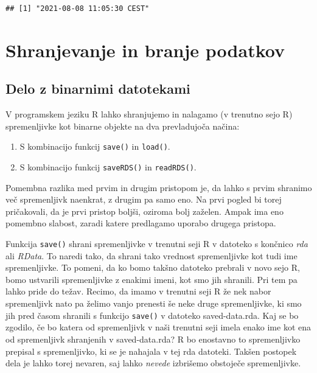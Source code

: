 \documentclass[
]{book}
\providecommand{\tightlist}{%
  \setlength{\itemsep}{0pt}\setlength{\parskip}{0pt}}
\begin{document}
\begin{verbatim}
## [1] "2021-08-08 11:05:30 CEST"
\end{verbatim}

\hypertarget{shranjevanje-in-branje-podatkov}{%
\section{Shranjevanje in branje podatkov}\label{shranjevanje-in-branje-podatkov}}

\hypertarget{delo-z-binarnimi-datotekami}{%
\subsection{Delo z binarnimi datotekami}\label{delo-z-binarnimi-datotekami}}

V programskem jeziku R lahko shranjujemo in nalagamo (v trenutno sejo R) spremenljivke kot binarne objekte na dva prevladujoča načina:

\begin{enumerate}
\def\labelenumi{\arabic{enumi})}
\tightlist
\item
  S kombinacijo funkcij \texttt{save()} in \texttt{load()}.
\item
  S kombinacijo funkcij \texttt{saveRDS()} in \texttt{readRDS()}.
\end{enumerate}

Pomembna razlika med prvim in drugim pristopom je, da lahko s prvim shranimo več spremenljivk naenkrat, z drugim pa samo eno. Na prvi pogled bi torej pričakovali, da je prvi pristop boljši, oziroma bolj zaželen. Ampak ima eno pomembno slabost, zaradi katere predlagamo uporabo drugega pristopa.

Funkcija \texttt{save()} shrani spremenljivke v trenutni seji R v datoteko s končnico \emph{rda} ali \emph{RData}. To naredi tako, da shrani tako vrednost spremenljivke kot tudi ime spremenljivke. To pomeni, da ko bomo takšno datoteko prebrali v novo sejo R, bomo ustvarili spremenljivke z enakimi imeni, kot smo jih shranili. Pri tem pa lahko pride do težav. Recimo, da imamo v trenutni seji R že nek nabor spremenljivk nato pa želimo vanjo prenesti še neke druge spremenljivke, ki smo jih pred časom shranili s funkcijo \texttt{save()} v datoteko saved-data.rda. Kaj se bo zgodilo, če bo katera od spremenljivk v naši trenutni seji imela enako ime kot ena od spremenljivk shranjenih v saved-data.rda? R bo enostavno to spremenljivko prepisal s spremenljivko, ki se je nahajala v tej rda datoteki. Takšen postopek dela je lahko torej nevaren, saj lahko \emph{nevede} izbrišemo obstoječe spremenljivke.
\end{document}
